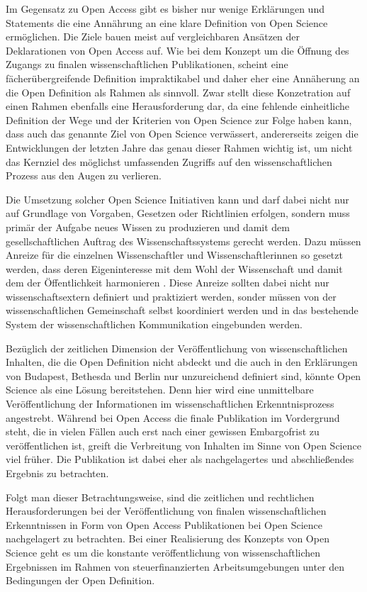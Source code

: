 Im Gegensatz zu Open Access gibt es bisher nur wenige Erklärungen und Statements die eine Annährung an eine klare Definition von Open Science ermöglichen. Die Ziele bauen meist auf vergleichbaren Ansätzen der Deklarationen von Open Access auf. Wie bei dem Konzept um die Öffnung des Zugangs zu finalen wissenschaftlichen Publikationen, scheint eine fächerübergreifende Definition impraktikabel und daher eher eine Annäherung an die Open Definition als Rahmen als sinnvoll. Zwar stellt diese Konzetration auf einen Rahmen ebenfalls eine Herausforderung dar, da eine fehlende einheitliche Definition der Wege und der Kriterien von Open Science zur Folge haben kann, dass auch das genannte Ziel von Open Science verwässert, andererseits zeigen die Entwicklungen der letzten Jahre das genau dieser Rahmen wichtig ist, um nicht das Kernziel des möglichst umfassenden Zugriffs auf den wissenschaftlichen Prozess aus den Augen zu verlieren.

Die Umsetzung solcher Open Science Initiativen kann und darf dabei nicht nur auf Grundlage von Vorgaben, Gesetzen oder Richtlinien erfolgen, sondern muss primär der Aufgabe neues Wissen zu produzieren und damit dem gesellschaftlichen Auftrag des Wissenschaftssystems gerecht werden. Dazu müssen Anreize für die einzelnen Wissenschaftler und Wissenschaftlerinnen so gesetzt werden, dass deren Eigeninteresse mit dem Wohl der Wissenschaft und damit dem der Öffentlichkeit harmonieren \cite{brembs2015open}. Diese Anreize sollten dabei nicht nur wissenschaftsextern definiert und praktiziert werden, sonder müssen von der wissenschaftlichen Gemeinschaft selbst koordiniert werden und in das bestehende System der wissenschaftlichen Kommunikation eingebunden werden.

Bezüglich der zeitlichen Dimension der Veröffentlichung von wissenschaftlichen Inhalten, die die Open Definition nicht abdeckt und die auch in den Erklärungen von Budapest, Bethesda und Berlin nur unzureichend definiert sind, könnte Open Science als eine Lösung bereitstehen. Denn hier wird eine unmittelbare Veröffentlichung der Informationen im wissenschaftlichen Erkenntnisprozess angestrebt. Während bei Open Access die finale Publikation im Vordergrund steht, die in vielen Fällen auch erst nach einer gewissen Embargofrist zu veröffentlichen ist, greift die Verbreitung von Inhalten im Sinne von Open Science viel früher. Die Publikation ist dabei eher als nachgelagertes und abschließendes Ergebnis zu betrachten.

Folgt man dieser Betrachtungsweise, sind die zeitlichen und rechtlichen Herausforderungen bei der Veröffentlichung von finalen wissenschaftlichen Erkenntnissen in Form von Open Access Publikationen bei Open Science nachgelagert zu betrachten. Bei einer Realisierung des Konzepts von Open Science geht es um die konstante veröffentlichung von wissenschaftlichen Ergebnissen im Rahmen von steuerfinanzierten Arbeitsumgebungen unter den Bedingungen der Open Definition.

